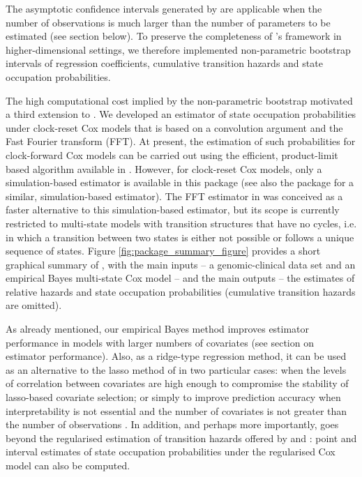The asymptotic confidence intervals generated by  are applicable when the number of observations is much larger than the number of parameters to be estimated (see section  below).  
To preserve the completeness of 's framework in higher-dimensional settings, we therefore implemented non-parametric bootstrap intervals of regression coefficients, cumulative transition hazards and state occupation probabilities.  

The high computational cost implied by the non-parametric bootstrap motivated a third extension to . We developed an estimator of state occupation probabilities under clock-reset Cox models  that is based on a convolution argument \citep[as in][]{Spitoni2012} and the Fast Fourier transform (FFT).  At present,  the estimation of such probabilities for clock-forward Cox models can be carried out using the efficient,  product-limit based algorithm available in .  However, for clock-reset Cox models,  only a simulation-based estimator is available in this package (see also the  package for a similar, simulation-based estimator). The FFT estimator in  was conceived as a faster alternative to this simulation-based estimator,  but its scope is currently restricted to multi-state models with transition structures that have no cycles, i.e.  in which a transition between two states is either not possible or follows a unique sequence of states.
 Figure \ref{fig:package_summary_figure} provides a short graphical summary of , with the main inputs -- a genomic-clinical data set and an empirical Bayes multi-state Cox model -- and the main outputs -- the estimates of relative hazards and state occupation probabilities (cumulative transition hazards are omitted).
 
 As already mentioned, our empirical Bayes method improves estimator performance in models with larger numbers of covariates (see section  on estimator performance). 
Also, as a ridge-type regression method, it can be used as an alternative to the lasso method of  in two particular cases:  when the levels of correlation between covariates are high enough to compromise the stability of lasso-based covariate selection; or simply to improve prediction accuracy when interpretability is not essential and the number of covariates is not greater than the number of observations \citep{Zou2005}.
In addition, and perhaps more importantly,   goes beyond the  regularised estimation of transition hazards offered by  and : point and interval estimates of state occupation probabilities under the regularised Cox model can also be computed.


